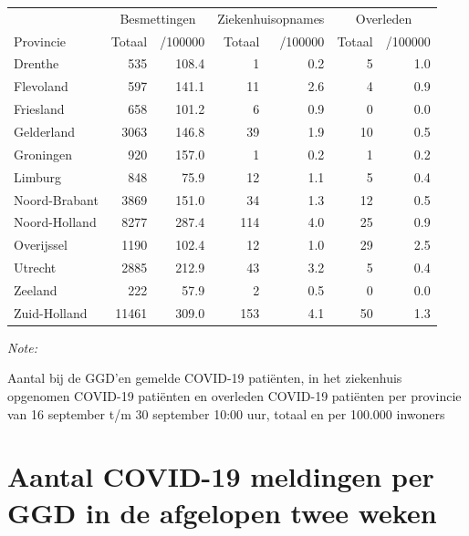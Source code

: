 \documentclass[
  english,
  man,floatsintext]{apa6}
\begin{document}
\begin{table}[H]
\centering
\begin{threeparttable}
\begin{tabular}{lrrrrrr}
\toprule
\multicolumn{1}{c}{ } & \multicolumn{2}{c}{Besmettingen} & \multicolumn{2}{c}{Ziekenhuisopnames} & \multicolumn{2}{c}{Overleden} \\
\cmidrule(l{3pt}r{3pt}){2-3} \cmidrule(l{3pt}r{3pt}){4-5} \cmidrule(l{3pt}r{3pt}){6-7}
Provincie & Totaal & /100000 & Totaal & /100000 & Totaal & /100000\\
\midrule
Drenthe & 535 & 108.4 & 1 & 0.2 & 5 & 1.0\\
Flevoland & 597 & 141.1 & 11 & 2.6 & 4 & 0.9\\
Friesland & 658 & 101.2 & 6 & 0.9 & 0 & 0.0\\
Gelderland & 3063 & 146.8 & 39 & 1.9 & 10 & 0.5\\
Groningen & 920 & 157.0 & 1 & 0.2 & 1 & 0.2\\
Limburg & 848 & 75.9 & 12 & 1.1 & 5 & 0.4\\
Noord-Brabant & 3869 & 151.0 & 34 & 1.3 & 12 & 0.5\\
Noord-Holland & 8277 & 287.4 & 114 & 4.0 & 25 & 0.9\\
Overijssel & 1190 & 102.4 & 12 & 1.0 & 29 & 2.5\\
Utrecht & 2885 & 212.9 & 43 & 3.2 & 5 & 0.4\\
Zeeland & 222 & 57.9 & 2 & 0.5 & 0 & 0.0\\
Zuid-Holland & 11461 & 309.0 & 153 & 4.1 & 50 & 1.3\\
\bottomrule
\end{tabular}
\begin{tablenotes}
\item \textit{Note: } 
\item Aantal bij de GGD’en gemelde COVID-19 patiënten, in het ziekenhuis opgenomen COVID-19 patiënten en overleden COVID-19 patiënten per provincie van 16 september t/m 30 september 10:00 uur, totaal en per 100.000 inwoners
\end{tablenotes}
\end{threeparttable}
\end{table}

\newpage

\hypertarget{aantal-covid-19-meldingen-per-ggd-in-de-afgelopen-twee-weken}{%
\section{Aantal COVID-19 meldingen per GGD in de afgelopen twee weken}\label{aantal-covid-19-meldingen-per-ggd-in-de-afgelopen-twee-weken}}
\end{document}
